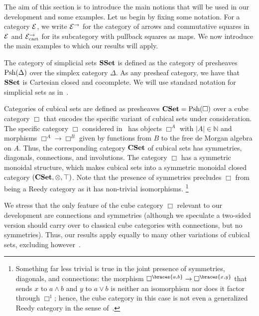 \documentclass[reqno,10pt,a4paper,oneside,draft]{amsart}
\begin{document}
The aim of this section is to introduce the main notions that will be used in our development and some examples.
Let us begin by fixing some notation.
For a category $\cal{E}$, we write $\cal{E}^\to$ for the category of arrows and commutative squares in $\cal{E}$ and $\cal{E}^\to_{\cart}$ for its subcategory with pullback squares as maps.
We now introduce the main examples to which our results will apply.

\begin{example}
The category of simplicial sets $\SSet$ is defined as the category of presheaves $\Psh(\Delta)$ over the simplex category $\Delta$.
As any presheaf category, we have that $\SSet$ is Cartesian closed and cocomplete.
We will use standard notation for simplicial sets as in~\cite{goerss-jardine}.
\end{example}

\begin{example}
Categories of cubical sets are defined as presheaves $\CSet = \Psh(\Box)$ over a cube category $\Box$ that encodes the specific variant of cubical sets under consideration.
The specific category $\Box$ considered in~\cite{cohen-et-al:cubicaltt} has objects $\Box^A$ with $|A| \in \mathbb{N}$ and morphisms $\Box^A \to \Box^B$ given by functions from $B$ to the free de Morgan algebra on $A$.
Thus, the corresponding category $\CSet$ of cubical sets has symmetries, diagonals, connections, and involutions.
The category $\Box$ has a symmetric monoidal structure, which makes cubical sets into a symmetric monoidal closed category $(\CSet, \otimes, \top)$.
Note that the presence of symmetries precludes $\Box$ from being a Reedy category as it has non-trivial isomorphisms.%
\footnote{
Something far less trivial is true in the joint presence of symmetries, diagonals, and connections: the morphism $\Box^{\braces{a, b}} \to \Box^{\braces{x, y}}$ that sends $x$ to $a \wedge b$ and $y$ to $a \vee b$ is neither an isomorphism nor does it factor through $\Box^1$; hence, the cube category in this case is not even a generalized Reedy category in the sense of~\cite{berger-moerdijk:generalized-reedy}.
}
\end{example}

We stress that the only feature of the cube category $\Box$ relevant to our development are connections and symmetries (although we speculate a two-sided version should carry over to classical cube categories with connections, but no symmetries).
Thus, our results apply equally to many other variations of cubical sets, excluding however~\cite{coquand-cubical-sets,huber-thesis}.
\end{document}
